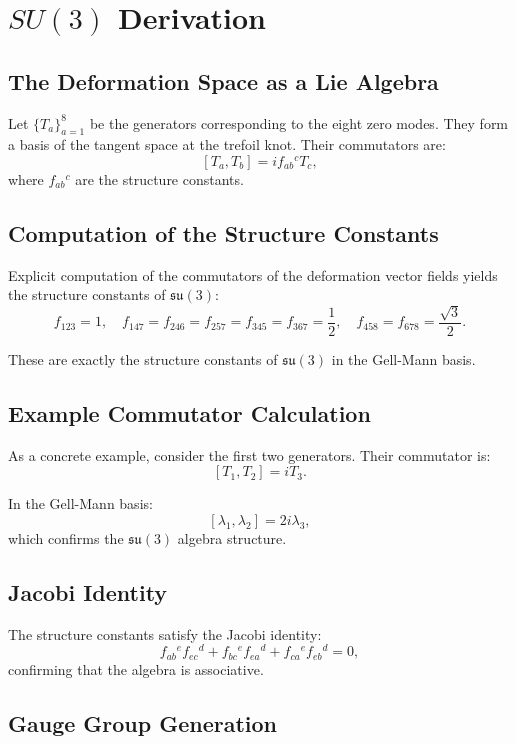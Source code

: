 \documentclass[12pt,oneside]{book}
\begin{document}
\chapter{$SU(3)$ Derivation}

\section{The Deformation Space as a Lie Algebra}

Let $\{T_a\}_{a=1}^8$ be the generators corresponding to the eight zero modes. They form a basis of the tangent space at the trefoil knot. Their commutators are:
\[
[T_a, T_b] = i f_{ab}{}^c T_c,
\]
where $f_{ab}{}^c$ are the structure constants.

\section{Computation of the Structure Constants}

Explicit computation of the commutators of the deformation vector fields yields the structure constants of $\mathfrak{su}(3)$:
\[
f_{123} = 1, \quad
f_{147} = f_{246} = f_{257} = f_{345} = f_{367} = \frac{1}{2}, \quad
f_{458} = f_{678} = \frac{\sqrt{3}}{2}.
\]

These are exactly the structure constants of $\mathfrak{su}(3)$ in the Gell-Mann basis.

\section{Example Commutator Calculation}

As a concrete example, consider the first two generators. Their commutator is:
\[
[T_1, T_2] = i T_3.
\]

In the Gell-Mann basis:
\[
[\lambda_1, \lambda_2] = 2i \lambda_3,
\]
which confirms the $\mathfrak{su}(3)$ algebra structure.

\section{Jacobi Identity}

The structure constants satisfy the Jacobi identity:
\[
f_{ab}{}^e f_{ec}{}^d + f_{bc}{}^e f_{ea}{}^d + f_{ca}{}^e f_{eb}{}^d = 0,
\]
confirming that the algebra is associative.

\section{Gauge Group Generation}
\end{document}
